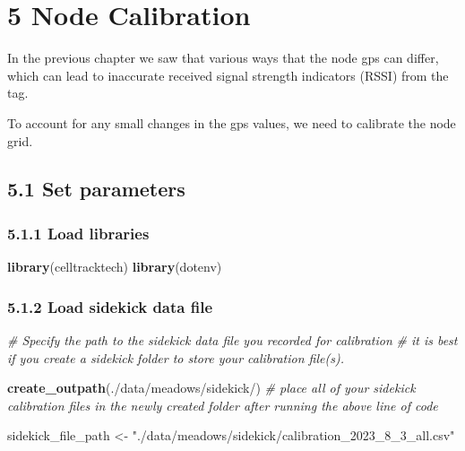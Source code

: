 \documentclass[
]{book}
\newenvironment{Shaded}{\begin{snugshade}}{\end{snugshade}}
\newcommand{\CommentTok}[1]{\textcolor[rgb]{0.56,0.35,0.01}{\textit{#1}}}
\newcommand{\FunctionTok}[1]{\textcolor[rgb]{0.13,0.29,0.53}{\textbf{#1}}}
\newcommand{\NormalTok}[1]{#1}
\newcommand{\OtherTok}[1]{\textcolor[rgb]{0.56,0.35,0.01}{#1}}
\newcommand{\StringTok}[1]{\textcolor[rgb]{0.31,0.60,0.02}{#1}}
\begin{document}
\chapter{5 Node Calibration}\label{node-calibration}

In the previous chapter we saw that various ways that the node gps can differ, which can lead to inaccurate received signal strength indicators (RSSI) from the tag.

To account for any small changes in the gps values, we need to calibrate the node grid.

\section{5.1 Set parameters}\label{set-parameters}

\subsection{5.1.1 Load libraries}\label{load-libraries}

\begin{Shaded}
\begin{Highlighting}[]
\FunctionTok{library}\NormalTok{(celltracktech)}
\FunctionTok{library}\NormalTok{(dotenv)}
\end{Highlighting}
\end{Shaded}

\subsection{5.1.2 Load sidekick data file}\label{load-sidekick-data-file}

\begin{Shaded}
\begin{Highlighting}[]
\CommentTok{\# Specify the path to the sidekick data file you recorded for calibration}
\CommentTok{\# it is best if you create a \textquotesingle{}sidekick\textquotesingle{} folder to store your calibration file(s).}

\FunctionTok{create\_outpath}\NormalTok{(}\StringTok{\textquotesingle{}./data/meadows/sidekick/\textquotesingle{}}\NormalTok{)}
\CommentTok{\# place all of your sidekick calibration files in the newly created folder after running the above line of code}

\NormalTok{sidekick\_file\_path }\OtherTok{\textless{}{-}} \StringTok{"./data/meadows/sidekick/calibration\_2023\_8\_3\_all.csv"}
\end{Highlighting}
\end{Shaded}
\end{document}
